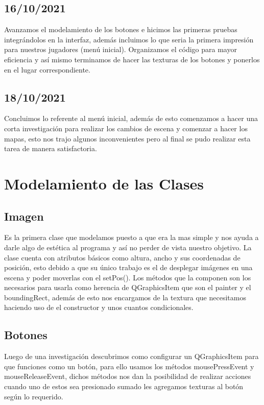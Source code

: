 \documentclass{article}
\begin{document}
    \subsection{16/10/2021}
    Avanzamos el modelamiento de los botones e hicimos las primeras pruebas integrándolos en la interfaz, además incluimos lo que seria la primera impresión para nuestros jugadores (menú inicial). Organizamos el código para mayor eficiencia y así mismo terminamos de hacer las texturas de los botones y ponerlos en el lugar correspondiente.
    
    \subsection{18/10/2021}
    Concluimos lo referente al menú inicial, además de esto comenzamos a hacer una corta investigación para realizar los cambios de escena y comenzar a hacer los mapas, esto nos trajo algunos inconvenientes pero al final se pudo realizar esta tarea de manera satisfactoria.
    
\section{Modelamiento de las Clases}
    \subsection{Imagen}
    Es la primera clase que modelamos puesto a que era la mas simple y nos ayuda a darle algo de estética al programa y así no perder de vista nuestro objetivo. La clase cuenta con atributos básicos como altura, ancho y sus coordenadas de posición, esto debido a que su único trabajo es el de desplegar imágenes en una escena y poder moverlas con el setPos(). Los métodos que la componen son los necesarios para usarla como herencia de QGraphicsItem que son el painter y el boundingRect, además de esto nos encargamos de la textura que necesitamos haciendo uso de el constructor y unos cuantos condicionales.
    
    \subsection{Botones}
    Luego de una investigación descubrimos como configurar un QGraphicsItem para que funciones como un botón, para ello usamos los métodos mousePressEvent y mouseReleaseEvent, dichos métodos nos dan la posibilidad de realizar acciones cuando uno de estos sea presionado sumado les agregamos texturas al botón según lo requerido. 
        
\end{document}
